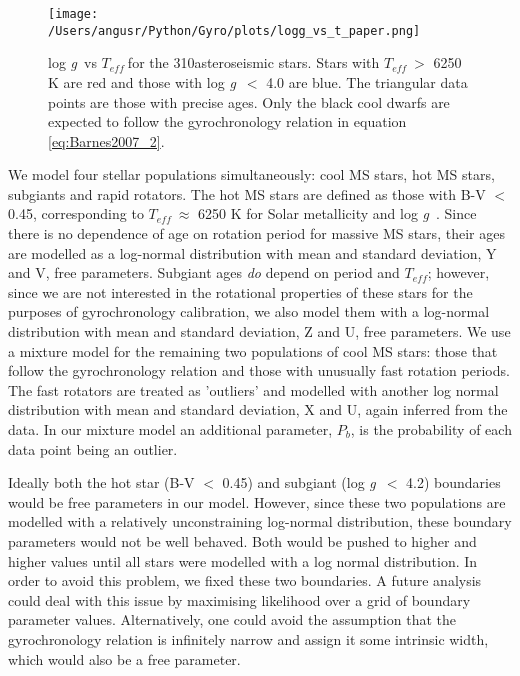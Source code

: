 \documentclass[10pt,preprint]{aastex}
\newcommand{\logg}{log \emph{g}~}
\newcommand{\teff}{$T_{eff}~$}
\newcommand{\nastero}{310}
\begin{document}
\begin{figure}[ht]
\begin{center}
\texttt{[image: /Users/angusr/Python/Gyro/plots/logg\_vs\_t\_paper.png]}
\caption{\logg vs \teff for the \nastero asteroseismic stars. Stars with \teff $>$ 6250 K are red and those with \logg $<$ 4.0 are blue. The triangular data points are those with precise ages. Only the black cool dwarfs are expected to follow the gyrochronology relation in equation \ref{eq:Barnes2007_2}.}
\label{fig:p_vs_a}
\end{center}
\end{figure}

We model four stellar populations simultaneously: cool MS stars, hot MS stars, subgiants and rapid rotators.
The hot MS stars are defined as those with B-V $<$ 0.45, corresponding to \teff $\approx$ 6250 K for Solar metallicity and \logg.
Since there is no dependence of age on rotation period for massive MS stars, their ages are modelled as a log-normal distribution with mean and standard deviation, Y and V, free parameters.
Subgiant ages \emph{do} depend on period and $T_{eff}$; however, since we are not interested in the rotational properties of these stars for the purposes of gyrochronology calibration, we also model them with a log-normal distribution with mean and standard deviation, Z and U, free parameters.
We use a mixture model for the remaining two populations of cool MS stars: those that follow the gyrochronology relation and those with unusually fast rotation periods.
The fast rotators are treated as 'outliers' and modelled with another log normal distribution with mean and standard deviation, X and U, again inferred from the data.
In our mixture model an additional parameter, $P_b$, is the probability of each data point being an outlier.

Ideally both the hot star (B-V $<$ 0.45) and subgiant (\logg $<$ 4.2) boundaries would be free parameters in our model.
However, since these two populations are modelled with a relatively unconstraining log-normal distribution, these boundary parameters would not be well behaved.
Both would be pushed to higher and higher values until all stars were modelled with a log normal distribution.
In order to avoid this problem, we fixed these two boundaries.
A future analysis could deal with this issue by maximising likelihood over a grid of boundary parameter values.
Alternatively, one could avoid the assumption that the gyrochronology relation is infinitely narrow and assign it some intrinsic width, which would also be a free parameter.
\end{document}
